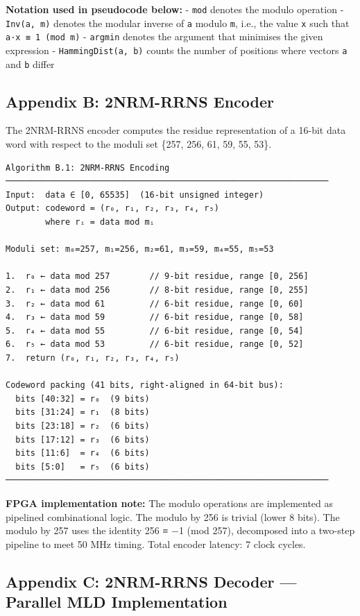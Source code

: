 \textbf{Notation used in pseudocode below:} - \texttt{mod} denotes the
modulo operation - \texttt{Inv(a,\ m)} denotes the modular inverse of
\texttt{a} modulo \texttt{m}, i.e., the value \texttt{x} such that
\texttt{a·x\ ≡\ 1\ (mod\ m)} - \texttt{argmin} denotes the argument that
minimises the given expression - \texttt{HammingDist(a,\ b)} counts the
number of positions where vectors \texttt{a} and \texttt{b} differ

\subsection{Appendix B: 2NRM-RRNS
Encoder}\label{appendix-b-2nrm-rrns-encoder}

The 2NRM-RRNS encoder computes the residue representation of a 16-bit
data word with respect to the moduli set \{257, 256, 61, 59, 55, 53\}.

\begin{verbatim}
Algorithm B.1: 2NRM-RRNS Encoding
─────────────────────────────────────────────────────────────────
Input:  data ∈ [0, 65535]  (16-bit unsigned integer)
Output: codeword = (r₀, r₁, r₂, r₃, r₄, r₅)
        where rᵢ = data mod mᵢ

Moduli set: m₀=257, m₁=256, m₂=61, m₃=59, m₄=55, m₅=53

1.  r₀ ← data mod 257        // 9-bit residue, range [0, 256]
2.  r₁ ← data mod 256        // 8-bit residue, range [0, 255]
3.  r₂ ← data mod 61         // 6-bit residue, range [0, 60]
4.  r₃ ← data mod 59         // 6-bit residue, range [0, 58]
5.  r₄ ← data mod 55         // 6-bit residue, range [0, 54]
6.  r₅ ← data mod 53         // 6-bit residue, range [0, 52]
7.  return (r₀, r₁, r₂, r₃, r₄, r₅)

Codeword packing (41 bits, right-aligned in 64-bit bus):
  bits [40:32] = r₀  (9 bits)
  bits [31:24] = r₁  (8 bits)
  bits [23:18] = r₂  (6 bits)
  bits [17:12] = r₃  (6 bits)
  bits [11:6]  = r₄  (6 bits)
  bits [5:0]   = r₅  (6 bits)
─────────────────────────────────────────────────────────────────
\end{verbatim}

\textbf{FPGA implementation note:} The modulo operations are implemented
as pipelined combinational logic. The modulo by 256 is trivial (lower 8
bits). The modulo by 257 uses the identity 256 ≡ −1 (mod 257),
decomposed into a two-step pipeline to meet 50 MHz timing. Total encoder
latency: 7 clock cycles.

\subsection{Appendix C: 2NRM-RRNS Decoder --- Parallel MLD
Implementation}\label{appendix-c-2nrm-rrns-decoder-parallel-mld-implementation}

